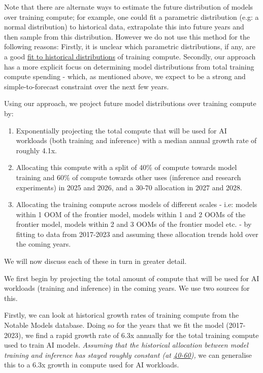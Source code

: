 \documentclass[11pt]{article}
\begin{document}
Note that there are alternate ways to estimate the future distribution of models over training compute; for example, one could fit a parametric distribution (e.g: a normal distribution) to historical data, extrapolate this into future years and then sample from this distribution. However we do not use this method for the following reasons: Firstly, it is unclear which parametric distributions, if any, are a good \underline{\hyperref[appendix-a-historical-distribution-of-notable-models-and-fit-data-choice]{fit to historical distributions}} of training compute. Secondly, our approach has a more explicit focus on determining model distributions from total training compute spending - which, as mentioned above, we expect to be a strong and simple-to-forecast constraint over the next few years.

Using our approach, we project future model distributions over training compute by:

\begin{enumerate}
\item Exponentially projecting the total compute that will be used for AI workloads (both training and inference) with a median annual growth rate of roughly 4.1x.

\item Allocating this compute with a split of 40\% of compute towards model training and 60\% of compute towards other uses (inference and research experiments) in 2025 and 2026, and a 30-70 allocation in 2027 and 2028.

\item Allocating the training compute across models of different scales - i.e: models within 1 OOM of the frontier model, models within 1 and 2 OOMs of the frontier model, models within 2 and 3 OOMs of the frontier model etc. - by fitting to data from 2017-2023 and assuming these allocation trends hold over the coming years.
\end{enumerate}

We will now discuss each of these in turn in greater detail.

We first begin by projecting the total amount of compute that will be used for AI workloads (training and inference) in the coming years. We use two sources for this.

Firstly, we can look at historical growth rates of training compute from the Notable Models database. Doing so for the years that we fit the model (2017-2023), we find a rapid growth rate of 6.3x annually for the total training compute used to train AI models. \textit{Assuming that the historical allocation between model training and inference has stayed roughly constant (at \underline{\hyperref[allocating-compute-between-training-inference-and-other-workloads]{40-60}}),} we can generalise this to a 6.3x growth in compute used for AI workloads.
\end{document}
